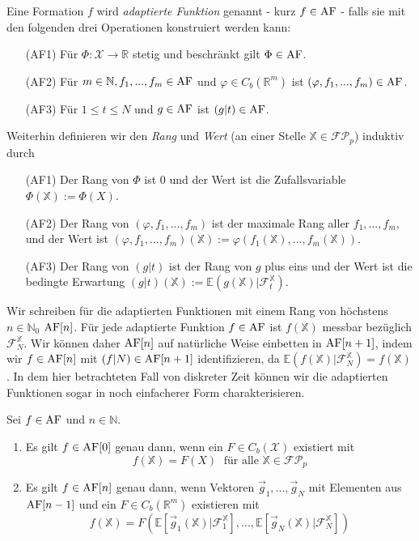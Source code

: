 \begin{definition}
Eine Formation $f$ wird \emph{adaptierte Funktion} genannt - kurz $f \in \operatorname{AF}$ - falls sie mit den folgenden drei Operationen konstruiert werden kann:
\begin{enumerate}
    \item[(AF1)] Für $\Phi: \mathcal{X} \rightarrow \mathbb{R}$ stetig und beschränkt gilt $\Phi \in \operatorname{AF}$.
    \item[(AF2)] Für $m \in \mathbb{N}, f_1,...,f_m \in \operatorname{AF}$ und $\varphi \in C_b(\mathbb{R}^m)$ ist $(\varphi, f_1, ..., f_m) \in \operatorname{AF}$.
    \item[(AF3)] Für $1\leq t \leq N$ und $g \in \operatorname{AF}$ ist $(g \vert t) \in \operatorname{AF}$.
\end{enumerate}
Weiterhin definieren wir den \emph{Rang} und \emph{Wert} (an einer Stelle $\mathbb{X} \in \mathcal{FP}_p$) induktiv durch 
\begin{enumerate}
    \item[(AF1)] Der Rang von $\Phi$ ist $0$ und der Wert ist die Zufallsvariable $\Phi(\mathbb{X}):=\Phi(X)$.
    \item[(AF2)] Der Rang von $(\varphi, f_1,...,f_m)$ ist der maximale Rang aller $f_1,...,f_m$, und der Wert ist $(\varphi, f_1,...,f_m)(\mathbb{X}):=\varphi(f_1(\mathbb{X}), ..., f_m(\mathbb{X}))$.
    \item[(AF3)] Der Rang von $(g \vert t)$ ist der Rang von $g$ plus eins und der Wert ist die bedingte Erwartung $(g\vert t)(\mathbb{X}) := \mathbb{E}(g(\mathbb{X}) \vert \mathcal{F}_t^\mathbb{X})$.
\end{enumerate}
\end{definition}
Wir schreiben für die adaptierten Funktionen mit einem Rang von höchstens $n \in \mathbb{N}_0$ $\operatorname{AF}[n]$. Für jede adaptierte Funktion $f \in \operatorname{AF}$ ist $f(\mathbb{X})$ messbar bezüglich $\mathcal{F}_N^\mathbb{X}$. Wir können daher $\operatorname{AF}[n]$ auf natürliche Weise einbetten in $\operatorname{AF}[n+1]$, indem wir $f \in \operatorname{AF}[n]$ mit $(f \vert N) \in \operatorname{AF}[n+1]$ identifizieren, da $\mathbb{E}(f(\mathbb{X}) \vert \mathcal{F}_N^\mathbb{X}) = f(\mathbb{X})$. In dem hier betrachteten Fall von diskreter Zeit können wir die adaptierten Funktionen sogar in noch einfacherer Form charakterisieren.
\begin{lemma}\label{thm:adapted_functions_char}
Sei $f \in \operatorname{AF}$ und $n \in \mathbb{N}$. 
\begin{enumerate}
    \item Es gilt $f \in \operatorname{AF}[0]$ genau dann, wenn ein $F \in C_b(\mathcal{X})$ existiert mit 
    $$f(\mathbb{X}) = F(X)\; \text{ für alle } \mathbb{X} \in \mathcal{FP}_p$$ 
    \item Es gilt $f \in \operatorname{AF}[n]$ genau dann, wenn Vektoren $\vec{g}_1,...,\vec{g}_N$ mit Elementen aus $\operatorname{AF}[n-1]$ und ein $F \in C_b(\mathbb{R}^m)$ existieren mit 
    $$f(\mathbb{X}) = F(\mathbb{E}[\vec{g}_1(\mathbb{X}) \vert \mathcal{F}_1^\mathbb{X}], ..., \mathbb{E}[\vec{g}_N(\mathbb{X}) \vert \mathcal{F}_N^{\mathbb{X}}])$$
\end{enumerate}
\end{lemma}
